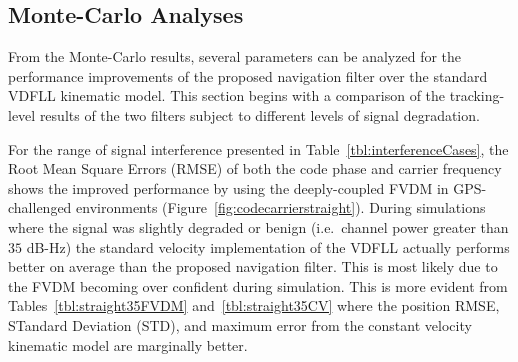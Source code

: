 \subsection{\textbf{Monte-Carlo Analyses}}
From the Monte-Carlo results, several parameters can be analyzed for the performance improvements of the proposed navigation filter over the standard VDFLL kinematic model. This section begins with a comparison of the tracking-level results of the two filters subject to different levels of signal degradation.

For the range of signal interference presented in Table~\ref{tbl:interferenceCases}, the Root Mean Square Errors (RMSE) of both the code phase and carrier frequency shows the improved performance by using the deeply-coupled FVDM in GPS-challenged environments (Figure~\ref{fig:codecarrierstraight}). During simulations where the signal was slightly degraded or benign (i.e.\ channel power greater than \(35\) dB-Hz) the standard velocity implementation of the VDFLL actually performs better on average than the proposed navigation filter. This is most likely due to the FVDM becoming over confident during simulation. This is more evident from Tables~\ref{tbl:straight35FVDM} and~\ref{tbl:straight35CV} where the position RMSE, STandard Deviation (STD), and maximum error from the constant velocity kinematic model are marginally better.

